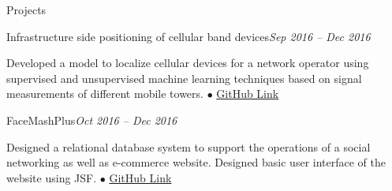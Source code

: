 \documentclass{resume} %
\begin{document}
\begin{rSection}{Projects}
\begin{rSubsection}{Infrastructure side positioning of cellular band devices}{\emph{Sep 2016 -- Dec 2016}}{}{}
\item Developed a model to localize cellular devices for a network operator using supervised and unsupervised machine learning techniques based on signal measurements of different mobile towers.
{\tiny$\bullet$}
\href{https://github.com/t-lohani/Netwok-side-Localization}{GitHub Link}
\end{rSubsection}


\begin{rSubsection}{FaceMashPlus}{\emph{Oct 2016 -- Dec 2016}}{}{}
\item Designed a relational database system to support the operations of a social networking as well as e-commerce website. Designed basic user interface of the website using JSF.
{\tiny$\bullet$}
\href{https://github.com/t-lohani/Facemash-Plus}{GitHub Link}
\end{rSubsection}

\end{rSection}
\end{document}
